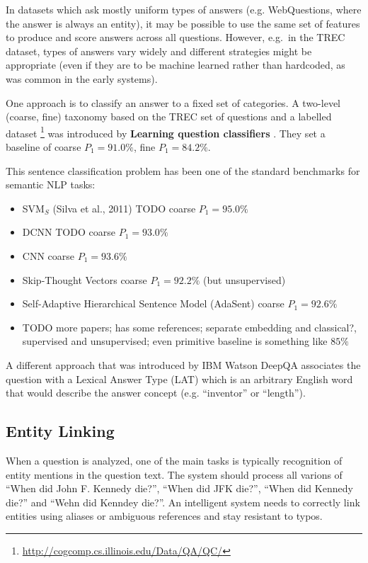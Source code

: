 In datasets which ask mostly uniform types of answers (e.g. WebQuestions,
where the answer is always an entity), it may be possible to use the same
set of features to produce and score answers across all questions.
However, e.g.\ in the TREC dataset, types of answers vary widely and
different strategies might be appropriate (even if they are to be machine
learned rather than hardcoded, as was common in the early systems).

One approach is to classify an answer to a fixed set of categories.
A two-level (coarse, fine) taxonomy based on the TREC set of questions and a labelled dataset%
\footnote{\url{http://cogcomp.cs.illinois.edu/Data/QA/QC/}}
was introduced by \textbf{Learning question classifiers} \citep{QCLearning}.
They set a baseline of coarse $P_1=91.0\%$, fine $P_1=84.2\%$.

This sentence classification problem has been one of the standard benchmarks
for semantic NLP tasks:
\begin{itemize}
	\item SVM$_S$ (Silva et al., 2011) TODO coarse $P_1=95.0\%$
	\item DCNN \citep{QtcDCNN} TODO coarse $P_1=93.0\%$
	\item CNN \citep{CNNSentClass} coarse $P_1=93.6\%$
	\item Skip-Thought Vectors \citep{SkipThought} coarse $P_1=92.2\%$ (but unsupervised)
	\item Self-Adaptive Hierarchical Sentence Model \citep{AdaSent} (AdaSent) coarse $P_1=92.6\%$
	\item TODO more papers; \citep{AdaSent} has some references; separate embedding and classical?, supervised and unsupervised; even primitive baseline is something like $85\%$
\end{itemize}

A different approach that was introduced by IBM Watson DeepQA \citep{WatsonTyCor}
associates the question with a Lexical Answer Type (LAT) which is
an arbitrary English word that would describe the answer concept
(e.g. ``inventor'' or ``length'').

\subsection{Entity Linking}
\label{sec:entitylink}

When a question is analyzed, one of the main tasks is typically recognition
of entity mentions in the question text.  The system should process all
varions of ``When did John F. Kennedy die?'', ``When did JFK die?'',
``When did Kennedy die?'' and ``Wehn did Kenndey die?''.  An intelligent
system needs to correctly link entities using aliases or ambiguous
references and stay resistant to typos.

